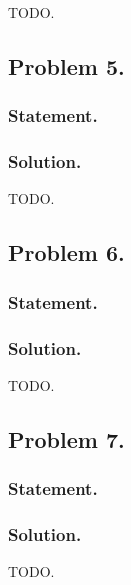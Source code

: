 TODO.
\subsection{Problem 5.}
\subsubsection{Statement.}
\subsubsection{Solution.}

TODO.
\subsection{Problem 6.}
\subsubsection{Statement.}
\subsubsection{Solution.}

TODO.
\subsection{Problem 7.}
\subsubsection{Statement.}
\subsubsection{Solution.}

TODO.

\EndArticle
